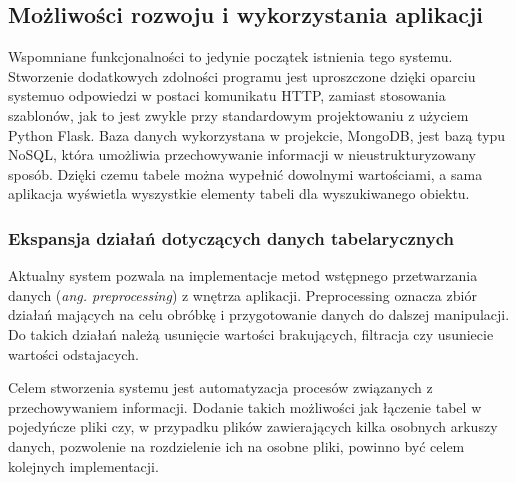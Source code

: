 \documentclass[12pt,a4paper,twoside]{article}
\begin{document}
\subsection{Możliwości rozwoju i wykorzystania aplikacji}
Wspomniane funkcjonalności to jedynie początek istnienia tego systemu. Stworzenie dodatkowych zdolności programu jest uproszczone dzięki oparciu systemu\break o odpowiedzi w postaci komunikatu HTTP, zamiast stosowania szablonów, jak to jest zwykle przy standardowym projektowaniu z użyciem Python Flask. Baza danych wykorzystana w projekcie, MongoDB, jest bazą typu NoSQL, która umożliwia przechowywanie informacji w nieustrukturyzowany sposób. Dzięki czemu tabele można wypełnić dowolnymi wartościami, a sama aplikacja wyświetla wyszystkie elementy tabeli dla wyszukiwanego obiektu.\par
\subsubsection{Ekspansja działań dotyczących danych tabelarycznych}
Aktualny system pozwala na implementacje metod wstępnego przetwarzania danych (\textit{ang. preprocessing}) z wnętrza aplikacji. Preprocessing oznacza zbiór działań mających na celu obróbkę i przygotowanie danych do dalszej manipulacji. Do takich działań należą usunięcie wartości brakujących, filtracja czy usuniecie wartości odstajacych. \par
Celem stworzenia systemu jest automatyzacja procesów związanych z przechowywaniem informacji. Dodanie takich możliwości jak łączenie tabel w pojedyńcze pliki czy, w przypadku plików zawierających kilka osobnych arkuszy danych, pozwolenie na rozdzielenie ich na osobne pliki, powinno być celem kolejnych implementacji.
\end{document}
